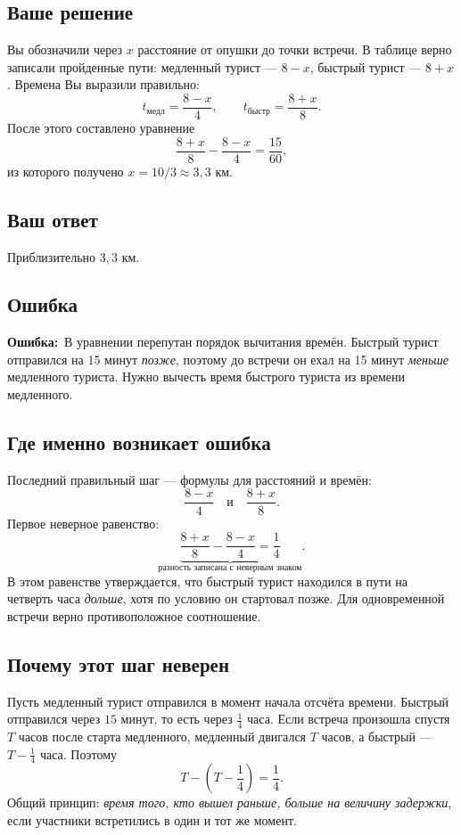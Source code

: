 \documentclass[a4paper,12pt]{article}
\newcommand{\errorlabel}{\textcolor{critical}{\textbf{Ошибка:}}}
\begin{document}
\subsection*{Ваше решение}
Вы обозначили через $x$ расстояние от опушки до точки встречи. В таблице верно записали пройденные пути: медленный турист --- $8-x$, быстрый турист --- $8+x$. Времена Вы выразили правильно:
\[
 t_{\text{медл}}=\frac{8-x}{4},\qquad
 t_{\text{быстр}}=\frac{8+x}{8}.
\]
После этого составлено уравнение
\[
 \frac{8+x}{8}-\frac{8-x}{4}=\frac{15}{60},
\]
из которого получено $x=10/3\approx3{,}3$ км.

\subsection*{Ваш ответ}
Приблизительно $3{,}3$ км.

\subsection*{Ошибка}
\errorlabel\ В уравнении перепутан порядок вычитания времён. Быстрый турист отправился на 15 минут \emph{позже}, поэтому до встречи он ехал на 15 минут \emph{меньше} медленного туриста. Нужно вычесть время быстрого туриста из времени медленного.

\subsection*{Где именно возникает ошибка}
Последний правильный шаг --- формулы для расстояний и времён:
\[
\frac{8-x}{4}\quad\text{и}\quad\frac{8+x}{8}.
\]
Первое неверное равенство:
\[
\underbrace{\frac{8+x}{8}-\frac{8-x}{4}=\frac14}_{\text{разность записана с неверным знаком}}.
\]
В этом равенстве утверждается, что быстрый турист находился в пути на четверть часа \emph{дольше}, хотя по условию он стартовал позже. Для одновременной встречи верно противоположное соотношение.

\subsection*{Почему этот шаг неверен}
Пусть медленный турист отправился в момент начала отсчёта времени. Быстрый отправился через $15$ минут, то есть через $\tfrac14$ часа. Если встреча произошла спустя $T$ часов после старта медленного, медленный двигался $T$ часов, а быстрый --- $T-\tfrac14$ часа. Поэтому
\[
 T-\left(T-\frac14\right)=\frac14.
\]
Общий принцип: \emph{время того, кто вышел раньше, больше на величину задержки}, если участники встретились в один и тот же момент.
\end{document}
